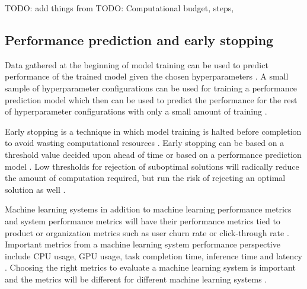 TODO: add things from \parencite{shallueMeasuringEffectsData2019}
TODO: Computational budget, steps, 

\subsection{Performance prediction and early stopping}

Data gathered at the beginning of model training can be used to predict performance of the trained model given the chosen hyperparameters \parencite{bakerAcceleratingNeuralArchitecture2017}. A small sample of hyperparameter configurations can be used for training a performance prediction model which then can be used to predict the performance for the rest of hyperparameter configurations with only a small amount of training \parencite{bakerAcceleratingNeuralArchitecture2017}.

Early stopping is a technique in which model training is halted before completion to avoid wasting computational resources \parencite{precheltAutomaticEarlyStopping1998}. Early stopping can be based on a threshold value decided upon ahead of time or based on a performance prediction model \parencite{bakerAcceleratingNeuralArchitecture2017}. Low thresholds for rejection of suboptimal solutions will radically reduce the amount of computation required, but run the risk of rejecting an optimal solution as well \parencite{bakerAcceleratingNeuralArchitecture2017}.

Machine learning systems in addition to machine learning performance metrics and system performance metrics will have their performance metrics tied to product or organization metrics such as user churn rate or click-through rate \parencite{shankarOperationalizingMachineLearning2022}. Important metrics from a machine learning system performance perspective include CPU usage, GPU usage, task completion time, inference time and latency \parencite{cardososilvaBenchmarkingMachineLearning2020}. Choosing the right metrics to evaluate a machine learning system is important and the metrics will be different for different machine learning systems \parencite{shankarOperationalizingMachineLearning2022}.